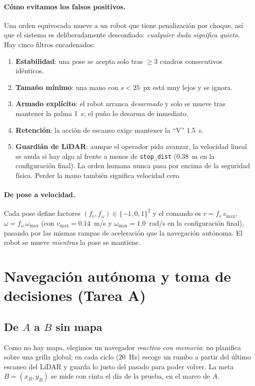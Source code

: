 \documentclass[11pt,a4paper]{article}
\begin{document}
\paragraph{C\'omo evitamos los falsos positivos.} Una orden equivocada mueve a un robot que tiene penalizaci\'on por choque, as\'i que el sistema es
deliberadamente desconfiado: \emph{cualquier duda significa quieto}. Hay cinco filtros encadenados:
\begin{enumerate}[nosep]
\item \textbf{Estabilidad}: una pose se acepta solo tras $\ge3$ cuadros consecutivos id\'enticos.
\item \textbf{Tama\~no m\'inimo}: una mano con $s<25$~px est\'a muy lejos y se ignora.
\item \textbf{Armado expl\'icito}: el robot arranca \emph{desarmado} y solo se mueve tras mantener la palma 1~s; el pu\~no lo desarma de inmediato.
\item \textbf{Retenci\'on}: la acci\'on de escaneo exige mantener la ``V'' 1.5~s.
\item \textbf{Guardi\'an de LiDAR}: aunque el operador pida avanzar, la velocidad lineal se anula si hay algo al frente a menos de \texttt{stop\_dist}
(0.38~m en la configuraci\'on final). La orden humana nunca pasa por encima de la seguridad f\'isica. Perder la mano tambi\'en significa velocidad cero.
\end{enumerate}

\paragraph{De pose a velocidad.} Cada pose define factores $(f_v,f_\omega)\in\{-1,0,1\}^2$ y el comando es $v=f_v\,v_{\max}$, $\omega=f_\omega\,\omega_{\max}$ (con
$v_{\max}=0.14$~m/s y $\omega_{\max}=1.0$~rad/s en la configuraci\'on final), pasando por las mismas rampas de aceleraci\'on que la navegaci\'on aut\'onoma. El robot
se mueve \emph{mientras} la pose se mantiene.

\section{Navegaci\'on aut\'onoma y toma de decisiones (Tarea A)}
\label{sec:nav}
\subsection{De $A$ a $B$ sin mapa}
Como no hay mapa, elegimos un navegador \emph{reactivo con memoria}: no planifica sobre una grilla global; en cada ciclo (20~Hz) escoge un rumbo a partir del
\'ultimo escaneo del LiDAR y guarda lo justo del pasado para poder volver. La meta $B=(x_B,y_B)$ se mide con cinta el d\'ia de la prueba, en el marco de $A$.
\end{document}
